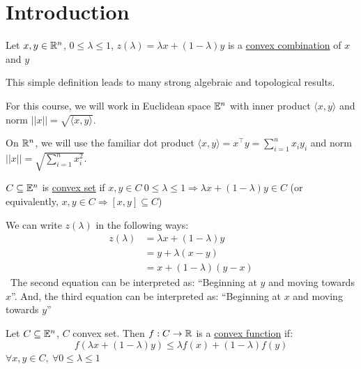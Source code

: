 \section{Introduction}

\begin{definition}
    Let $x, y \in \mathbb{R}^n$, $0 \leq \lambda \leq 1$, $z(\lambda) = \lambda x + (1 - \lambda)y$ is a \underline{convex combination} of $x$ and $y$
\end{definition}

This simple definition leads to many strong algebraic and topological results.

For this course, we will work in Euclidean space $\mathbb{E}^n$ with inner product $\langle x, y \rangle$ and norm $||x|| = \sqrt{\langle x, y \rangle}$.

On $\mathbb{R}^n$, we will use the familiar dot product $\langle x, y \rangle = x^\intercal y = \sum_{i = 1}^n x_iy_i$ and norm $||x|| = \sqrt{\sum_{i=1}^n x_i^2}$.

\begin{definition}
    $C \subseteq \mathbb{E}^n$ is \underline{convex set} if $x, y \in C \ 0 \leq \lambda \leq 1 \Rightarrow \lambda x + (1- \lambda)y \in C$ (or equivalently, $x, y \in C \Rightarrow [x,y] \subseteq C$)
\end{definition}

\begin{note} We can write $z(\lambda)$ in the following ways:
    \begin{align*}
        z(\lambda) &= \lambda x + (1 - \lambda) y \\
        &= y + \lambda (x - y) \\
        &= x + (1 - \lambda)(y - x)
    \end{align*}
\
    The second equation can be interpreted as: ``Beginning at $y$ and moving towards $x$''. And, the third equation can be interpreted as: ``Beginning at $x$ and moving towards $y$''
\end{note}

\begin{definition}
    Let $C \subseteq \mathbb{E}^n$, $C$ convex set. Then $f: C \rightarrow \mathbb{R}$ is a \underline{convex function} if:
    \begin{equation*}
        f(\lambda x + (1 - \lambda) y) \leq \lambda f(x) + (1 - \lambda)f(y)
    \end{equation*}
    $\forall x, y \in C, \ \forall 0 \leq \lambda \leq 1$
\end{definition}

